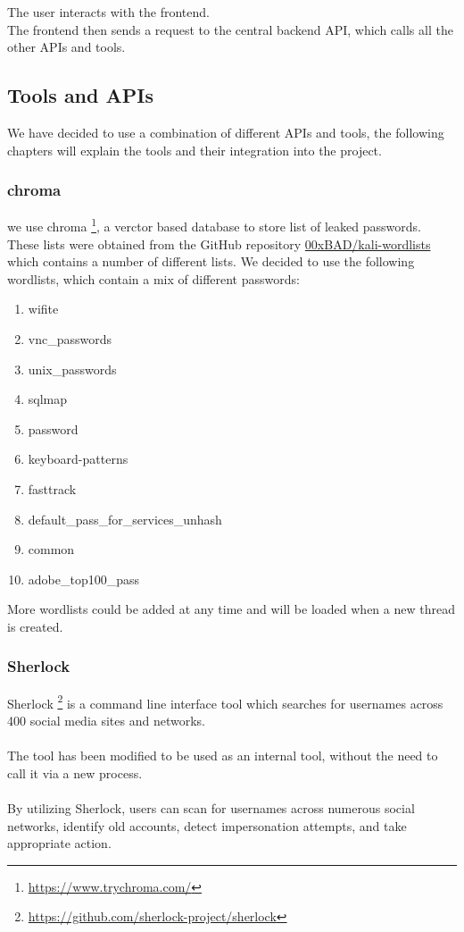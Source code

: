 \documentclass[
    a4paper,
    pagesize,
	pdftex,
    12pt,
]{scrartcl}
\begin{document}
The user interacts with the frontend. \\
The frontend then sends a request to the central backend API, which calls all the other APIs and tools.

\subsection{Tools and APIs}
We have decided to use a combination of different APIs and tools, the following chapters will explain the tools and their integration into the project.

\subsubsection{chroma}
we use chroma \footnote{\url{https://www.trychroma.com/}}, a verctor based database to store list of leaked passwords. These lists were obtained from the GitHub repository \hyperlink{https://github.com/00xBAD/kali-wordlists}{00xBAD/kali-wordlists} which contains a number of different lists. We decided to use the following wordlists, which contain a mix of different passwords:
\begin{enumerate}
	\item wifite
	\item vnc\_passwords
	\item unix\_passwords
	\item sqlmap
	\item password
	\item keyboard-patterns
	\item fasttrack
	\item default\_pass\_for\_services\_unhash
	\item common
	\item adobe\_top100\_pass
\end{enumerate}
More wordlists could be added at any time and will be loaded when a new thread is created.

\subsubsection{Sherlock}
Sherlock \footnote{\url{https://github.com/sherlock-project/sherlock}} is a command line interface tool which searches for usernames across 400 social media sites and networks.
\\ \\
The tool has been modified to be used as an internal tool, without the need to call it via a new process.
\\ \\
By utilizing Sherlock, users can scan for usernames across numerous social networks, identify old accounts, detect impersonation attempts, and take appropriate action.
\end{document}
